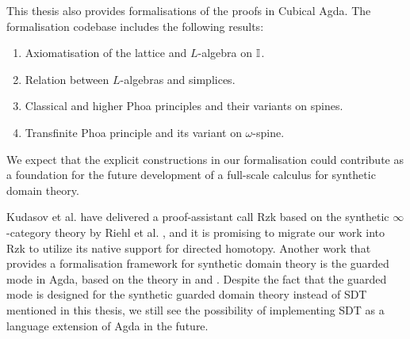 This thesis also provides formalisations of the proofs in Cubical Agda. The formalisation codebase includes the following results:
\begin{enumerate}
    \item Axiomatisation of the lattice and $L$-algebra on $\mathbb{I}$.
    \item Relation between $L$-algebras and simplices.
    \item Classical and higher Phoa principles and their variants on spines.
    \item Transfinite Phoa principle and its variant on $\omega$-spine.
\end{enumerate}
We expect that the explicit constructions in our formalisation could contribute as a foundation for the future development of a full-scale calculus for synthetic domain theory.

Kudasov et al. have delivered a proof-assistant call Rzk \cite{kudasov_formalizing_2023} based on the synthetic $\infty$-category theory by Riehl et al. \cite{riehl_type_2023}, and it is promising to migrate our work into Rzk to utilize its native support for directed homotopy. Another work that provides a formalisation framework for synthetic domain theory is the guarded mode in Agda, based on the theory in \cite{mogelberg_bisimulation_2019} and \cite{kristensen_greatest_2022}. Despite the fact that the guarded mode is designed for the synthetic guarded domain theory \cite{birkedal_first_2012} instead of SDT mentioned in this thesis, we still see the possibility of implementing SDT as a language extension of Agda in the future.


